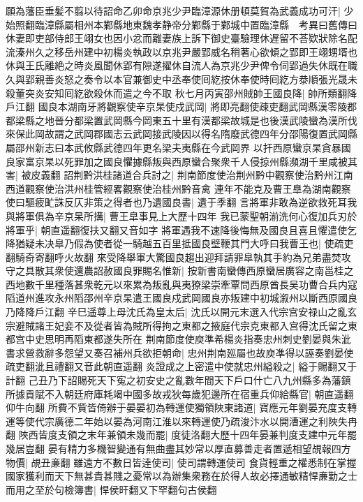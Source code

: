 願為藩臣垂髪不翦以待詔命乙卯命京兆少尹臨漳源休册頓莫賀為武義成功可汗|{
	少始照翻臨漳縣屬相州本鄴縣地東魏孝静帝分鄴縣于鄴城中置臨漳縣　考異曰舊傳曰休妻即吏部侍郎王翊女也因小忿而離妻族上訴下御史臺驗理休遅留不荅欵狀除名配流溱州久之移岳州建中初楊炎執政以京兆尹嚴郢威名稍著心欲傾之郢即王翊甥壻也休與王氏離絶之時炎風聞休郢有隙遂擢休自流人為京兆少尹俾令伺郢過失休既在職久與郢親善炎怒之奏令以本官兼御史中丞奉使囘紇按休奉使時囘紇方㳟順張光晟未殺董突炎安知囘紇欲殺休而遣之今不取}
秋七月丙寅邵州賊帥王國良降|{
	帥所類翻降戶江翻}
國良本湖南牙將觀察使辛京杲使戍武岡|{
	將即亮翻使疎吏翻武岡縣漢零陵郡都梁縣之地晉分都梁置武岡縣今岡東五十里有漢都梁故城是也後漢武陵蠻為漢所伐來保此岡故謂之武岡郡國志云武岡接武陵因以得名隋廢武德四年分邵陽復置武岡縣屬邵州新志曰本武攸縣武德四年更名梁夫夷縣在今武岡界}
以扞西原蠻京杲貪暴國良家富京杲以死罪加之國良懼據縣叛與西原蠻合聚衆千人侵掠州縣瀕湖千里咸被其害|{
	被皮義翻}
詔荆黔洪桂諸道合兵討之|{
	荆南節度使治荆州黔中觀察使治黔州江南西道觀察使治洪州桂管經畧觀察使治桂州黔音禽}
連年不能克及曹王臯為湖南觀察使曰驅疲甿誅反仄非策之得者也乃遺國良書|{
	遺于季翻}
言將軍非敢為逆欲救死耳我與將軍俱為辛京杲所搆|{
	曹王臯事見上大歷十四年}
我已蒙聖朝湔洗何心復加兵刃於將軍乎|{
	朝直遥翻復扶又翻又音如字}
將軍遇我不速降後悔無及國良且喜且懼遣使乞降猶疑未决臯乃假為使者從一騎越五百里抵國良壁鞭其門大呼曰我曹王也|{
	使疏吏翻騎奇寄翻呼火故翻}
來受降舉軍大驚國良趨出迎拜請罪臯執其手約為兄弟盡焚攻守之具散其衆使還農詔赦國良罪賜名惟新|{
	按新書南蠻傳西原蠻居廣容之南邕桂之西地數千里種落甚衆乾元以來累為叛亂與夷獠梁崇牽覃問西原酋長吴功曹合兵内寇䧟道州進攻永州䧟邵州辛京杲遣王國良戍武岡國良亦叛建中初城溆州以斷西原國良乃降降戶江翻}
辛巳遥尊上母沈氏為皇太后|{
	沈氏以開元末選入代宗宫安禄山之亂玄宗避賊諸王妃妾不及從者皆為賊所得拘之東都之掖庭代宗克東都入宫得沈氏留之東都宫中史思明再䧟東都遂失所在}
荆南節度使庾準希楊炎指奏忠州刺史劉晏與朱泚書求營救辭多怨望又奏召補州兵欲拒朝命|{
	忠州荆南廵屬也故庾凖得以誣奏劉晏使疏吏翻泚且禮翻又音此朝直遥翻}
炎證成之上密遣中使就忠州縊殺之|{
	縊于賜翻又于計翻}
己丑乃下詔賜死天下寃之初安史之亂數年間天下戶口什亡八九州縣多為藩鎮所據貢賦不入朝廷府庫耗竭中國多故戎狄每歲犯邊所在宿重兵仰給縣官|{
	朝直遥翻仰牛向翻}
所費不貲皆倚辦于晏晏初為轉運使獨領陜東諸道|{
	寶應元年劉晏充度支轉運等使代宗廣德二年始以晏為河南江淮以來轉運使乃疏浚汴水以開漕運之利陜失冉翻}
陜西皆度支領之末年兼領未幾而罷|{
	度徒洛翻大歷十四年晏兼判度支建中元年罷幾居豈翻}
晏有精力多機智變通有無曲盡其妙常以厚直募善走者置遞相望覘報四方物價|{
	覘丑亷翻}
雖遠方不數日皆逹使司|{
	使司謂轉運使司}
食貨輕重之權悉制在掌握國家獲利而天下無甚貴甚賤之憂常以為辦集衆務在於得人故必擇通敏精悍亷勤之士而用之至於句檢簿書|{
	悍侯旰翻又下罕翻句古侯翻}
